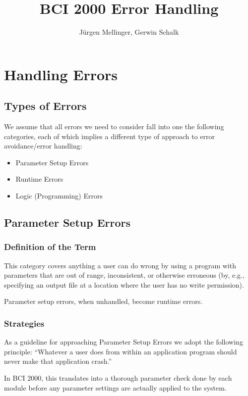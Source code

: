 \documentclass[12pt,a4paper]{article}
\title{BCI 2000 Error Handling}
\author{J\"urgen Mellinger, Gerwin Schalk}
\begin{document}
\maketitle
\tableofcontents

\pagebreak
\section{Handling Errors}
\label{secHandl}
\subsection{Types of Errors}
We assume that all errors we need to consider fall 
into one the following categories, each of which
implies a different type of approach to error
avoidance/error handling:
\begin{itemize}
\item{Parameter Setup Errors}
\item{Runtime Errors}
\item{Logic (Programming) Errors}
\end{itemize}

\subsection{Parameter Setup Errors}

\subsubsection{Definition of the Term}

This category covers anything a user can do wrong
by using a program with parameters that are out of range,
inconsistent, or otherwise erroneous (by, e.g.,
specifying an output file at a location where the user
has no write permission).

Parameter setup errors, when unhandled, become runtime errors.

\subsubsection{Strategies}
\label{secParamcheck}

As a guideline for approaching Parameter Setup Errors
we adopt the following principle: ``Whatever a
user does from within an application program should never
make that application crash.''

In BCI 2000, this translates into a thorough parameter
check done by each module before any parameter settings are
actually applied to the system.
\end{document}
